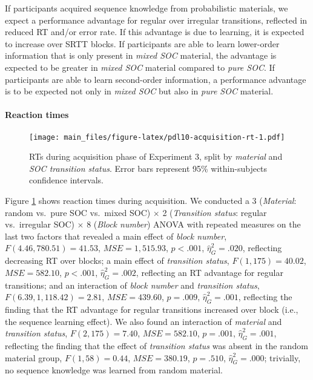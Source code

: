 \documentclass[english,,man]{apa6}
\begin{document}
If participants acquired sequence knowledge from probabilistic materials, we expect a performance advantage for regular over irregular transitions, reflected in reduced RT and/or error rate.
If this advantage is due to learning, it is expected to increase over SRTT blocks.
If participants are able to learn lower-order information that is only present in \emph{mixed SOC} material, the advantage is expected to be greater in \emph{mixed SOC} material compared to \emph{pure SOC}.
If participants are able to learn second-order information, a performance advantage is to be expected not only in \emph{mixed SOC} but also in \emph{pure SOC} material.

\hypertarget{reaction-times-2}{%
\paragraph{Reaction times}\label{reaction-times-2}}

\begin{figure}
\centering
\texttt{[image: main\_files/figure-latex/pdl10-acquisition-rt-1.pdf]}
\caption{\label{fig:pdl10-acquisition-rt}RTs during acquisition phase of Experiment 3, split by \emph{material} and \emph{SOC transition status}. Error bars represent 95\% within-subjects confidence intervals.}
\end{figure}

Figure \ref{fig:pdl10-acquisition-rt} shows reaction times during acquisition.
We conducted a 3 (\emph{Material}: random vs.~pure SOC vs.~mixed SOC) \(\times\) 2 (\emph{Transition status}: regular vs.~irregular SOC) \(\times\) 8 (\emph{Block number}) ANOVA with repeated measures on the last two factors that revealed
a main effect of \emph{block number}, \(F(4.46, 780.51) = 41.53\), \(\mathit{MSE} = 1,515.93\), \(p < .001\), \(\hat{\eta}^2_G = .020\), reflecting decreasing RT over blocks;
a main effect of \emph{transition status}, \(F(1, 175) = 40.02\), \(\mathit{MSE} = 582.10\), \(p < .001\), \(\hat{\eta}^2_G = .002\), reflecting an RT advantage for regular transitions;
and an interaction of \emph{block number} and \emph{transition status}, \(F(6.39, 1,118.42) = 2.81\), \(\mathit{MSE} = 439.60\), \(p = .009\), \(\hat{\eta}^2_G = .001\),
reflecting the finding that the RT advantage for regular transitions increased over block (i.e., the sequence learning effect).
We also found an interaction of \emph{material} and \emph{transition status}, \(F(2, 175) = 7.40\), \(\mathit{MSE} = 582.10\), \(p = .001\), \(\hat{\eta}^2_G = .001\),
reflecting the finding that the effect of \emph{transition status} was absent in the random material group,
\(F(1, 58) = 0.44\), \(\mathit{MSE} = 380.19\), \(p = .510\), \(\hat{\eta}^2_G = .000\);
trivially, no sequence knowledge was learned from random material.
\end{document}
